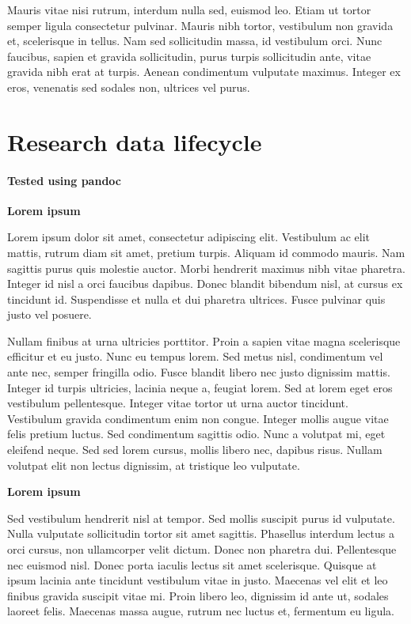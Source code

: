 \documentclass[
]{book}
\begin{document}
Mauris vitae nisi rutrum, interdum nulla sed, euismod leo. Etiam ut tortor semper ligula consectetur pulvinar. Mauris nibh tortor, vestibulum non gravida et, scelerisque in tellus. Nam sed sollicitudin massa, id vestibulum orci. Nunc faucibus, sapien et gravida sollicitudin, purus turpis sollicitudin ante, vitae gravida nibh erat at turpis. Aenean condimentum vulputate maximus. Integer ex eros, venenatis sed sodales non, ultrices vel purus.

\hypertarget{research-data-lifecycle}{%
\chapter{Research data lifecycle}\label{research-data-lifecycle}}

\hypertarget{tested-using-pandoc}{%
\subsubsection{Tested using pandoc}\label{tested-using-pandoc}}

\textbf{Lorem ipsum}

Lorem ipsum dolor sit amet, consectetur adipiscing elit. Vestibulum ac
elit mattis, rutrum diam sit amet, pretium turpis. Aliquam id commodo
mauris. Nam sagittis purus quis molestie auctor. Morbi hendrerit maximus
nibh vitae pharetra. Integer id nisl a orci faucibus dapibus. Donec
blandit bibendum nisl, at cursus ex tincidunt id. Suspendisse et nulla
et dui pharetra ultrices. Fusce pulvinar quis justo vel posuere.

Nullam finibus at urna ultricies porttitor. Proin a sapien vitae magna
scelerisque efficitur et eu justo. Nunc eu tempus lorem. Sed metus nisl,
condimentum vel ante nec, semper fringilla odio. Fusce blandit libero
nec justo dignissim mattis. Integer id turpis ultricies, lacinia neque
a, feugiat lorem. Sed at lorem eget eros vestibulum pellentesque.
Integer vitae tortor ut urna auctor tincidunt. Vestibulum gravida
condimentum enim non congue. Integer mollis augue vitae felis pretium
luctus. Sed condimentum sagittis odio. Nunc a volutpat mi, eget eleifend
neque. Sed sed lorem cursus, mollis libero nec, dapibus risus. Nullam
volutpat elit non lectus dignissim, at tristique leo vulputate.

\textbf{Lorem ipsum}

Sed vestibulum hendrerit nisl at tempor. Sed mollis suscipit purus id
vulputate. Nulla vulputate sollicitudin tortor sit amet sagittis.
Phasellus interdum lectus a orci cursus, non ullamcorper velit dictum.
Donec non pharetra dui. Pellentesque nec euismod nisl. Donec porta
iaculis lectus sit amet scelerisque. Quisque at ipsum lacinia ante
tincidunt vestibulum vitae in justo. Maecenas vel elit et leo finibus
gravida suscipit vitae mi. Proin libero leo, dignissim id ante ut,
sodales laoreet felis. Maecenas massa augue, rutrum nec luctus et,
fermentum eu ligula.
\end{document}
